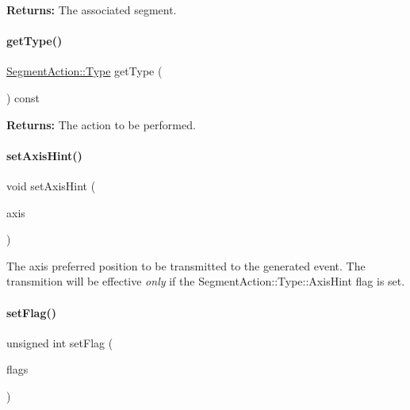 {\bfseries Returns\+:} The associated {\ttfamily segment}. \mbox{\label{classKite_1_1SegmentAction_a093e88be27fab140cca8ec652beab529}} 
\paragraph{\texorpdfstring{get\+Type()}{getType()}}
{\footnotesize\ttfamily \hyperlink{classKite_1_1SegmentAction_a1d1cfd8ffb84e947f82999c682b666a7}{Segment\+Action\+::\+Type} get\+Type (\begin{DoxyParamCaption}{ }\end{DoxyParamCaption}) const\hspace{0.3cm}{\ttfamily [inline]}}

{\bfseries Returns\+:} The action to be performed. \mbox{\label{classKite_1_1SegmentAction_a8dc7cdf5f643a856fa5208bcfd1f8342}} 
\paragraph{\texorpdfstring{set\+Axis\+Hint()}{setAxisHint()}}
{\footnotesize\ttfamily void set\+Axis\+Hint (\begin{DoxyParamCaption}\item[{\textbf{ Db\+U\+::\+Unit}}]{axis }\end{DoxyParamCaption})\hspace{0.3cm}{\ttfamily [inline]}}

The axis preferred position to be transmitted to the generated event. The transmition will be effective {\itshape only} if the Segment\+Action\+::\+Type\+::\+Axis\+Hint flag is set. \mbox{\label{classKite_1_1SegmentAction_a4e1f44319a9a0a413fe1413a87ec78bd}} 
\paragraph{\texorpdfstring{set\+Flag()}{setFlag()}}
{\footnotesize\ttfamily unsigned int set\+Flag (\begin{DoxyParamCaption}\item[{unsigned int}]{flags }\end{DoxyParamCaption})\hspace{0.3cm}{\ttfamily [inline]}}

